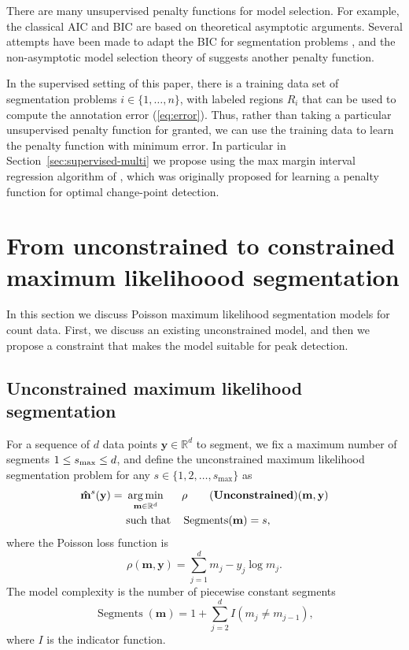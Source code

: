 \documentclass{article}
\DeclareMathOperator*{\argmin}{arg\,min}
\DeclareMathOperator*{\Segments}{Segments}
\newcommand{\RR}{\mathbb R}
\begin{document}
There are many unsupervised penalty functions for model selection. For
example, the classical AIC \citep{Akaike73} and BIC \citep{Schwarz78} are based
on theoretical asymptotic arguments. Several attempts have been made
to adapt the BIC for segmentation problems \citep{Yao88,
  mBIC}, and the non-asymptotic model selection theory of
\citet{cleynen2013segmentation} suggests another penalty function.

In the supervised setting of this paper, there is a training data set
of segmentation problems $i\in\{1, \dots, n\}$, with labeled regions
$R_i$ that can be used to compute the annotation error
(\ref{eq:error}). Thus, rather than taking a particular unsupervised
penalty function for granted, we can use the training data to learn
the penalty function with minimum error. In particular in
Section~\ref{sec:supervised-multi} we propose using the max margin interval
regression algorithm of \citet{HOCKING-penalties}, which was
originally proposed for learning a penalty function for optimal
change-point detection.

\section{From unconstrained to constrained maximum likelihoood
  segmentation}
\label{sec:model}

In this section we discuss Poisson maximum likelihood segmentation
models for count data. First, we discuss an existing unconstrained
model, and then we propose a constraint that makes the model suitable
for peak detection.

\subsection{Unconstrained maximum likelihood segmentation}

For a sequence of $d$ data points $\mathbf y\in\RR^d$ to segment, we
fix a maximum number of segments $1 \leq s_{\text{\text{max}}}\leq d$,
and define the unconstrained maximum likelihood segmentation problem
for any $s\in\{1, 2, \dots, s_{\max}\}$ as
\begin{align*}
  \label{unconstrained}
  \mathbf{\hat m}^s(\mathbf y)  =\ 
  &\argmin_{\mathbf m\in\RR^{d}} && 
  \rho
  \tag{\textbf{Unconstrained}}
  (\mathbf m, \mathbf y) \\
  &\text{such that} && \Segments(\mathbf m)=s,
\end{align*}
where the Poisson loss function is
\begin{equation}\label{eq:rho}
  \rho(\mathbf m, \mathbf y)= \sum_{j=1}^d m_j - y_j \log m_j.
\end{equation} 
The model complexity is the number of piecewise constant segments
\begin{equation}
  \Segments(\mathbf m)=1+\sum_{j=2}^d I(m_j \neq m_{j-1}),
\end{equation}
where $I$ is the indicator function. 
\end{document}
